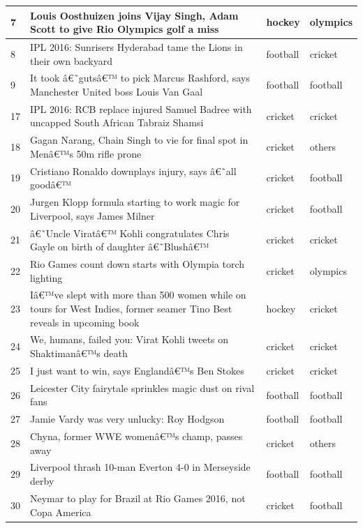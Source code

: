 \documentclass[12pt]{article}
\begin{document}
\begin{longtable}{ |p{2.0cm} | p{10.0cm} | p{2.0cm} |p{2.0cm}| }
7 &  Louis Oosthuizen joins Vijay Singh, Adam Scott to give Rio Olympics golf a miss & hockey & olympics \\\hline										
8 &  IPL 2016: Sunrisers Hyderabad tame the Lions in their own backyard & football & cricket \\\hline										
9 &  It took â€˜gutsâ€™ to pick Marcus Rashford, says Manchester United boss Louis Van Gaal & football & football \\\hline										
17 &  IPL 2016: RCB replace injured Samuel Badree with uncapped South African Tabraiz Shamsi & cricket & cricket \\\hline										
18 &  Gagan Narang, Chain Singh to vie for final spot in Menâ€™s 50m rifle prone & cricket & others \\\hline										
19 &  Cristiano Ronaldo downplays injury, says â€˜all goodâ€™ & cricket & football \\\hline										
20 &  Jurgen Klopp formula starting to work magic for Liverpool, says James Milner & cricket & football \\\hline										
21 &  â€˜Uncle Viratâ€™ Kohli congratulates Chris Gayle on birth of daughter â€˜Blushâ€™ & cricket & cricket \\\hline										
22 &  Rio Games count down starts with Olympia torch lighting & cricket & olympics \\\hline										
23 &  Iâ€™ve slept with more than 500 women while on tours for West Indies, former seamer Tino Best reveals in upcoming book & hockey & cricket \\\hline										
24 &  We, humans, failed you: Virat Kohli tweets on Shaktimanâ€™s death & cricket & cricket \\\hline										
25 &  I just want to win, says Englandâ€™s Ben Stokes & cricket & cricket \\\hline										
26 &  Leicester City fairytale sprinkles magic dust on rival fans & football & football \\\hline										
27 &  Jamie Vardy was very unlucky: Roy Hodgson & football & football \\\hline										
28 &  Chyna, former WWE womenâ€™s champ, passes away & cricket & others \\\hline										
29 &  Liverpool thrash 10-man Everton 4-0 in Merseyside derby & football & football \\\hline										
30 &  Neymar to play for Brazil at Rio Games 2016, not Copa America & cricket & football \\\hline										

\end{longtable}
\end{document}

